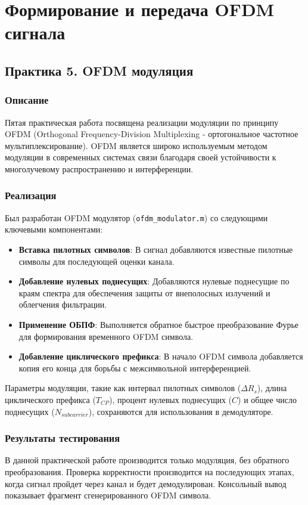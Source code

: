 \chapter{Формирование и передача OFDM сигнала}

\section{Практика 5. OFDM модуляция}

\subsection{Описание}
Пятая практическая работа посвящена реализации модуляции по принципу OFDM (Orthogonal Frequency-Division Multiplexing - ортогональное частотное мультиплексирование). OFDM является широко используемым методом модуляции в современных системах связи благодаря своей устойчивости к многолучевому распространению и интерференции.

\subsection{Реализация}
Был разработан OFDM модулятор (\texttt{ofdm\_modulator.m}) со следующими ключевыми компонентами:
\begin{itemize}
    \item \textbf{Вставка пилотных символов}: В сигнал добавляются известные пилотные символы для последующей оценки канала.
    \item \textbf{Добавление нулевых поднесущих}: Добавляются нулевые поднесущие по краям спектра для обеспечения защиты от внеполосных излучений и облегчения фильтрации.
    \item \textbf{Применение ОБПФ}: Выполняется обратное быстрое преобразование Фурье для формирования временного OFDM символа.
    \item \textbf{Добавление циклического префикса}: В начало OFDM символа добавляется копия его конца для борьбы с межсимвольной интерференцией.
\end{itemize}
Параметры модуляции, такие как интервал пилотных символов ($\Delta R_s$), длина циклического префикса ($T_{CP}$), процент нулевых поднесущих ($C$) и общее число поднесущих ($N_{subcarrier}$), сохраняются для использования в демодуляторе.

\subsection{Результаты тестирования}
В данной практической работе производится только модуляция, без обратного преобразования. Проверка корректности производится на последующих этапах, когда сигнал пройдет через канал и будет демодулирован. Консольный вывод показывает фрагмент сгенерированного OFDM символа.

